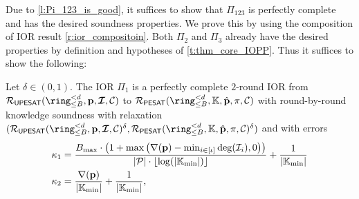 \documentclass[11pt,letterpaper,usenames,dvipsnames]{article}
\begin{document}
Due to \cref{l:Pi_123_is_good}, it  suffices to show that $\Pi_{123}$ is perfectly complete and has the desired soundness properties.  We prove this by using the composition of IOR result \cref{r:ior_compositoin}.  Both $\Pi_2$ and $\Pi_3$ already have the desired properties by definition and hypotheses of \cref{t:thm_core_IOPP}. Thus it suffices to show the following:
%
\begin{lemma}\label{l:completeness_soundness_Pi_1}
    Let $\delta\in (0,1)$. The IOR $\Pi_1$ is a perfectly complete $2$-round IOR from $\PIMSAT(\ringtwobounds{B}{\moduledegree}, \pp,\bm{\ideal}, \cC)$ to $\PESAT(\ringtwobounds{B}{\moduledegree}, \KK,\hat{\pp}, \pi,  \cC)$ with round-by-round knowledge soundness  with relaxation $(\PIMSAT(\ringtwobounds{B}{\moduledegree}, \pp,\bm{\ideal}, \cC)^\delta,\PESAT(\ringtwobounds{B}{\moduledegree}, \KK,\hat{\pp}, \pi,  \cC)^\delta)$ and with errors 
    \begin{align*}
    \kappa_1 &=  \frac{B_{\max}\cdot \left(1+\max\left(\nabla(\mathbf{p}) - \min_{i\in [\iota]} \deg(\mathcal{I}_i),0\right)\right)}{|\mathcal{P}|\cdot \lfloor\log(|\mathbb{K}_{\min}|)\rfloor} + \frac{1}{|\mathbb{K}_{\min}|} \\
    \kappa_2 &= \frac{\nabla(\mathbf{p})}{|\mathbb{K}_{\min}|} + \frac{1}{|\mathbb{K}_{\min}|},
    \end{align*}
\end{lemma}
\end{document}
